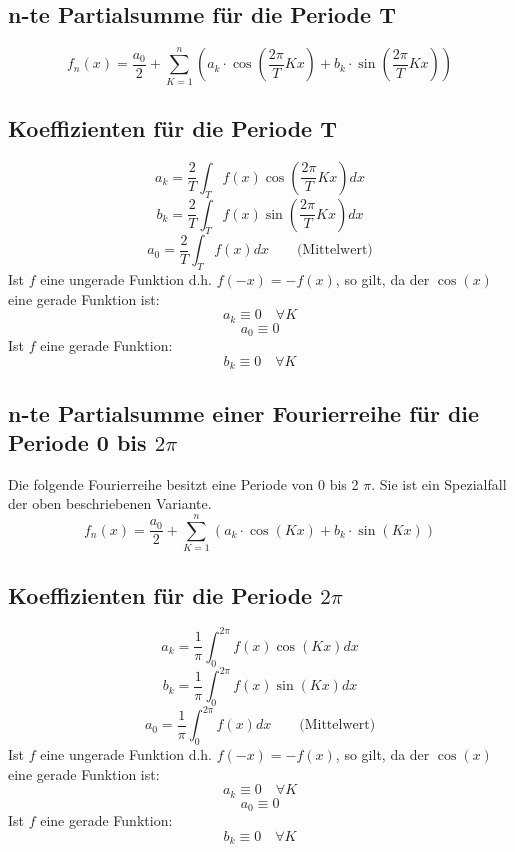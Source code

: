 \subsection{n-te Partialsumme für die Periode T}\label{subsec:fouriert}
\[ \boxed{f_n(x) = \frac{a_0}{2} + \sum_{K=1}^n \left(a_k \cdot 
\cos\left(\frac{2 \pi}{T} K x\right) + b_k \cdot 
\sin\left(\frac{2 \pi}{T} K x\right)\right)} \]

\subsection{Koeffizienten für die Periode T}
\[ \boxed{a_k = \frac{2}{T} \int_T f(x) \cos(\frac{2 \pi}{T} K x) dx} \]
\[ \boxed{b_k = \frac{2}{T} \int_T f(x) \sin(\frac{2 \pi}{T} K x) dx} \]
\[ \boxed{a_0 = \frac{2}{T} \int_T f(x) dx} 
\qquad \text{(Mittelwert)}\]
Ist $f$ eine ungerade Funktion d.h. $f(-x) = -f(x)$, so gilt, da der $\cos(x)$ 
eine gerade Funktion ist: 
\[ a_k \equiv 0 \quad \forall K\]
\[ a_0 \equiv 0 \]
Ist $f$ eine gerade Funktion: 
\[ b_k \equiv 0 \quad \forall K \]

\subsection{n-te Partialsumme einer Fourierreihe für die Periode 0 bis $2\pi$}
\label{subsec:fourierpi}
Die folgende Fourierreihe besitzt eine Periode von 0 bis 2 $\pi$.
Sie ist ein Spezialfall der oben beschriebenen Variante.
\[ \boxed{f_n(x) = \frac{a_0}{2} + \sum_{K=1}^n \left(a_k \cdot \cos(Kx) + b_k 
\cdot \sin(Kx)\right)} \]

\subsection{Koeffizienten für die Periode $2\pi$}
\[ \boxed{a_k = \frac{1}{\pi} \int_0^{2 \pi} f(x) \cos(K x) dx} \]
\[ \boxed{b_k = \frac{1}{\pi} \int_0^{2 \pi} f(x) \sin(K x) dx} \]
\[ \boxed{a_0 = \frac{1}{\pi} \int_0^{2 \pi} f(x) dx} 
\qquad \text{(Mittelwert)}\]
Ist $f$ eine ungerade Funktion d.h. $f(-x) = -f(x)$, so gilt, da der $\cos(x)$ 
eine gerade Funktion ist: 
\[ a_k \equiv 0 \quad \forall K\]
\[ a_0 \equiv 0 \]
Ist $f$ eine gerade Funktion: 
\[ b_k \equiv 0 \quad \forall K \]

